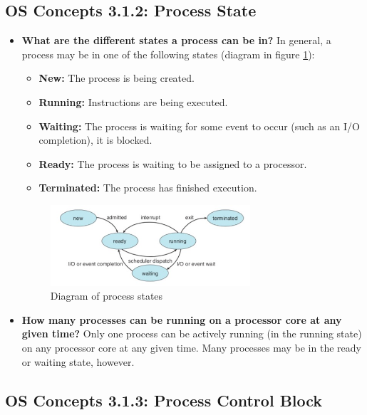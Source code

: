 \documentclass[12pt]{article}
\begin{document}
\subsection*{OS Concepts 3.1.2: Process State}

\begin{itemize}
    \item \textbf{What are the different states a process can be in?} In general, a process may be in one of the following states (diagram in figure \ref{fig:process-states}):
    \begin{itemize}
        \item \textbf{New:} The process is being created.
        \item \textbf{Running:} Instructions are being executed.
        \item \textbf{Waiting:} The process is waiting for some event to occur (such as an I/O completion), it is blocked.
        \item \textbf{Ready:} The process is waiting to be assigned to a processor.
        \item \textbf{Terminated:} The process has finished execution.
    \end{itemize}
    \begin{figure}[ht]
        \centering
        \includegraphics[width=0.7\textwidth]{figures/process-states.jpg}
        \caption{Diagram of process states}
        \label{fig:process-states}
    \end{figure}
\item \textbf{How many processes can be running on a processor core at any given time?} Only one process can be actively running (in the running state) on any processor core at any given time. Many processes may be in the ready or waiting state, however.
\end{itemize}

\subsection*{OS Concepts 3.1.3: Process Control Block}
\end{document}
